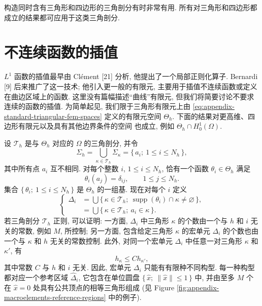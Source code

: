\setcounter{statement}{4}
\begin{Remark}\label{rem:appendix-mixed-triangle-quadrilateral-mesh}
构造同时含有三角形和四边形的三角剖分有时非常有用.
所有对三角形和四边形都成立的结果都可应用于这类三角剖分.
\end{Remark}

\section{不连续函数的插值}
\label{sec:appendix-interpolation-discontinuous-functions}

$L^1$ 函数的插值最早由 Clément [21] 分析, 他提出了一个局部正则化算子.
Bernardi [9] 后来推广了这一技术; 他引入更一般的有限元,
主要用于插值不连续函数或定义在曲边区域上的函数.
这里没有篇幅描述``曲线''有限元, 但我们将简要讨论不要求连续的函数的插值.
为简单起见, 我们限于三角形有限元上由
\eqref{eq:appendix-standard-triangular-fem-spaces} 定义的有限元空间
$\Theta_h$. 下面的结果对更高维、四边形有限元以及具有其他边界条件的空间
也成立, 例如 $\Theta_h\cap H_0^1(\Omega)$.

设 $\mathcal{T}_h$ 是与 $\Theta_h$ 对应的 $\Omega$ 的三角剖分, 并令
\[
\Sigma_h
=
\bigcup_{\kappa\in\mathcal{T}_h}\Sigma_\kappa
=
\{\,a_i;\ 1\leq i\leq N_h\,\},
\]
其中所有点 $a_i$ 互不相同. 对每个整数 $i$, $1\leq i\leq N_h$,
恰有一个函数 $\theta_i\in\Theta_h$ 满足
\[
\theta_i(a_j)=\delta_{ij},
\qquad
1\leq j\leq N_h.
\]
集合 $\{\,\theta_i;\ 1\leq i\leq N_h\,\}$ 是 $\Theta_h$ 的一组基.
现在对每个 $i$ 定义
\begin{equation}\label{eq:appendix-macroelement-definition}
\left\{
\begin{aligned}
\Delta_i
&=
\bigcup\{\,\kappa\in\mathcal{T}_h;
\ \operatorname{supp}(\theta_i)\cap\kappa\ne\varnothing\,\},\\
&=
\bigcup\{\,\kappa\in\mathcal{T}_h;
\ a_i\in\kappa\,\}.
\end{aligned}
\right.
\end{equation}
若三角剖分 $\mathcal{T}_h$ 正则, 可以证明:
一方面, $\Delta_i$ 中三角形 $\kappa$ 的个数由一个与 $h$ 和 $i$
无关的常数, 例如 $M$, 所控制; 另一方面, 包含给定三角形
$\kappa$ 的宏单元 $\Delta_i$ 的个数也由一个与 $\kappa$ 和 $h$
无关的常数控制. 此外, 对同一个宏单元 $\Delta_i$ 中任意一对三角形
$\kappa$ 和 $\kappa'$, 有
\[
h_\kappa\leq Ch_{\kappa'},
\]
其中常数 $C$ 与 $h$ 和 $i$ 无关.
因此, 宏单元 $\Delta_i$ 只能有有限种不同构型.
每一种构型都对应一个参考区域 $\hat\Delta_i$,
它包含在单位圆盘
$\{\,\hat x;\ \|\hat x\|\leq1\,\}$ 中,
并由至多 $M$ 个在 $\hat x=0$ 处具有公共顶点的相等三角形组成
(见 Figure \ref{fig:appendix-macroelements-reference-regions} 中的例子).

